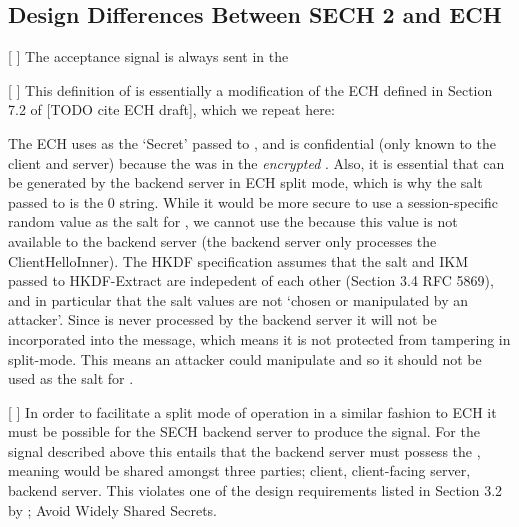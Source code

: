 \subsection{Design Differences Between SECH 2 and ECH}
[ ] The acceptance signal is always sent in the 

[ ] This definition of  is essentially a modification of the ECH  defined in Section 7.2 of [TODO cite ECH draft], which we repeat here:

The ECH  uses  as the `Secret' passed to , and  is confidential (only known to the client and server) because the  was in the {\em encrypted} . Also, it is essential that  can be generated by the backend server in ECH split mode, which is why the salt passed to  is the 0 string. While it would be more secure to use a session-specific random value as the salt for , we cannot use the  because this value is not available to the backend server (the backend server only processes the ClientHelloInner). The HKDF specification assumes that the salt and IKM passed to HKDF-Extract are indepedent of each other (Section 3.4 RFC 5869), and in particular that the salt values are not `chosen or manipulated by an attacker'.
Since  is never processed by the backend server it will not be incorporated into the  message, which means it is not protected from tampering in split-mode. This means an attacker could manipulate  and so it should not be used as the salt for .

[ ] In order to facilitate a split mode of operation in a similar fashion to ECH it must be possible for the SECH backend server to produce  the  signal. For the signal described above this entails that the backend server must possess the , meaning  would be shared amongst three parties; client, client-facing server, backend server. This violates one of the design requirements listed in Section 3.2 by \cite{rfc8744-issues}; Avoid Widely Shared Secrets.

